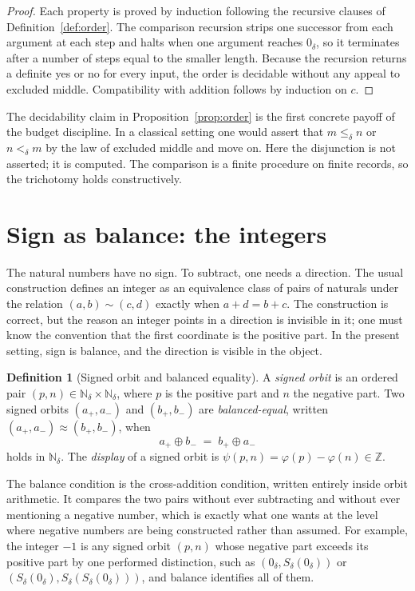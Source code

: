 \documentclass[11pt,a4paper]{article}
\theoremstyle{definition}
\newtheorem{definition}[theorem]{Definition}
\theoremstyle{remark}
\newcommand{\Nd}{\mathbb{N}_\delta}
\newcommand{\Sd}{S_\delta}
\newcommand{\zd}{0_\delta}
\newcommand{\oad}{\oplus}
\begin{document}
\begin{proof}
Each property is proved by induction following the recursive clauses of
Definition~\ref{def:order}. The comparison recursion strips one successor from
each argument at each step and halts when one argument reaches $\zd$, so it
terminates after a number of steps equal to the smaller length. Because the
recursion returns a definite yes or no for every input, the order is decidable
without any appeal to excluded middle. Compatibility with addition follows by
induction on $c$.
\end{proof}

The decidability claim in Proposition~\ref{prop:order} is the first concrete
payoff of the budget discipline. In a classical setting one would assert that
$m \leq_\delta n$ or $n <_\delta m$ by the law of excluded middle and move on.
Here the disjunction is not asserted; it is computed. The comparison is a finite
procedure on finite records, so the trichotomy holds constructively.

\section{Sign as balance: the integers}\label{sec:sign}

The natural numbers have no sign. To subtract, one needs a direction. The usual
construction defines an integer as an equivalence class of pairs of naturals
under the relation $(a,b) \sim (c,d)$ exactly when $a + d = b + c$. The
construction is correct, but the reason an integer points in a direction is
invisible in it; one must know the convention that the first coordinate is the
positive part. In the present setting, sign is balance, and the direction is
visible in the object.

\begin{definition}[Signed orbit and balanced equality]\label{def:signedorbit}
A \emph{signed orbit} is an ordered pair $(p, n) \in \Nd \times \Nd$, where $p$
is the positive part and $n$ the negative part. Two signed orbits $(a_+, a_-)$
and $(b_+, b_-)$ are \emph{balanced-equal}, written
$(a_+, a_-) \approx (b_+, b_-)$, when
\[
  a_+ \oad b_- \;=\; b_+ \oad a_-
\]
holds in $\Nd$. The \emph{display} of a signed orbit is
$\psi(p, n) = \varphi(p) - \varphi(n) \in \mathbb{Z}$.
\end{definition}

The balance condition is the cross-addition condition, written entirely inside
orbit arithmetic. It compares the two pairs without ever subtracting and without
ever mentioning a negative number, which is exactly what one wants at the level
where negative numbers are being constructed rather than assumed. For example,
the integer $-1$ is any signed orbit $(p, n)$ whose negative part exceeds its
positive part by one performed distinction, such as $(\zd, \Sd(\zd))$ or
$(\Sd(\zd), \Sd(\Sd(\zd)))$, and balance identifies all of them.
\end{document}
